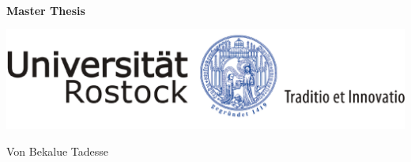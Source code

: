 \thispagestyle{empty}
\begin{titlepage}

  \condTWOSIDE{\changetext{}{19mm}{}{19mm}{}}

  \begin{center}
  	
  	\LARGE \textbf{\myTitle}   \\
  	\vspace{0.5cm}
  	
  	\Large \textbf{Master Thesis} \\
  	\vspace{0.8cm}
  \end{center} 
  
  
\begin{center}
	
	
	\includegraphics[width=14cm]{4.graphics/logo/logo_uni_ro} \\ 
	\vspace{.9cm}
	\Large \myFaculty       %
	
	\vspace{8cm}
	\Large Von  Bekalue Tadesse
\end{center}



  \condTWOSIDE{\changetext{}{-19mm}{}{-19mm}{}}

\end{titlepage}
